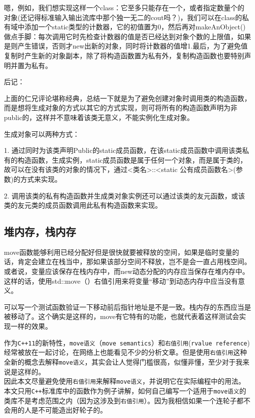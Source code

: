 嗯，例如，我们想实现这样一个class：它至多只能存在一个，或者指定数量个的对象(还记得标准输入输出流库中那个独一无二的cout吗？)，我们可以在class的私有域中添加一个static类型的计数器，它的初值置为0，然后再对makeAnObject()做点手脚：每次调用它时先检查计数器的值是否已经达到对象个数的上限值，如果是则产生错误，否则才new出新的对象，同时将计数器的值增1.最后，为了避免值复制时产生新的对象副本，除了将构造函数置为私有外，复制构造函数也要特别声明并置为私有。


后记：

上面的仁兄评论堪称经典，总结一下就是为了避免创建对象时调用类的构造函数，而是想将生成对象的方式以其它的方式实现，则可将所有的构造函数声明为非public的，这样并不意味着该类无意义，不能实例化生成对象。

生成对象可以两种方式：

1. 通过同时为该类声明Public的static成员函数，在该static成员函数中调用该类私有的构造函数，生成实例，static成员函数是属于任何一个对象，而是属于类的，故可以在没有该类的对象的情况下，通过<类名>::<static 公有成员函数名>(参数)的方式来实现。

2. 调用该类的私有构造函数并生成类对象实例还可以通过该类的友元函数，或该类的友元类的成员函数调用此私有构造函数来实现。
\subsection{堆内存，栈内存}
move函数能够利用已经分配好但是很快就要被释放的空间，如果是临时变量的话，肯定会建立在栈当中，那如果该部分空间不释放，岂不是会一直占用栈空间。或者说，变量应该保存在栈内存中，而new动态分配的内存应当保存在堆内存中。这样的话，使用std::move（）右值引用来将变量“移动”到动态内存中应当没有意义。

可以写一个测试函数验证一下移动前后指针地址是不是一致。栈内存的东西应当是被移动了。这个确实是这样的，move有它特有的功能，也就代表着这样测试会实现一样的效果。

作为\texttt{C++11}的新特性，\texttt{move语义}（\texttt{move\ semantics}）和\texttt{右值引用}(\texttt{rvalue\ reference})经常被放在一起讨论，在网络上也能看见不少的分析文章。但是使用\texttt{右值引用}这种全新的概念去解释\texttt{move语义}，其实会让人觉得门槛很高，似懂非懂，至少对于我来说是这样的。\\
因此本文尽量避免使用\texttt{右值引用}来解释\texttt{move语义}，并说明它在实际编程中的用法。本文只用\texttt{C++}标准库中的函数作为例子讲解，如何自己编写一个适用于\texttt{move语义}的类库不是考虑范围之内（因为这涉及到\texttt{右值引用}）。因为我相信如果一个连轮子都不会用的人是不可能造出好轮子的。

